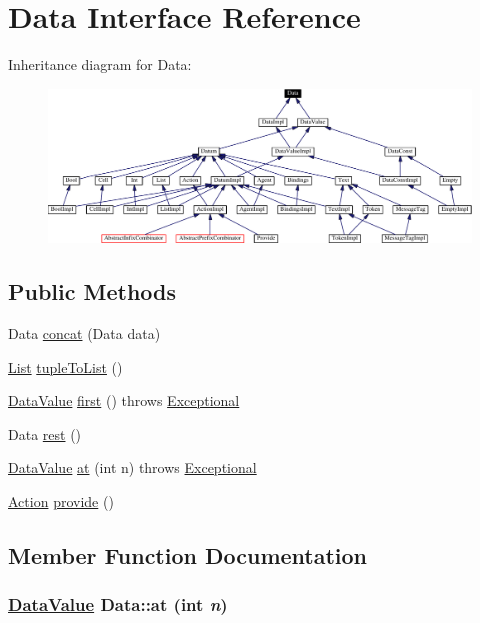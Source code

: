 \hypertarget{interfaceData}{
\section{Data  Interface Reference}
\label{interfaceData}
}
Inheritance diagram for Data:\begin{figure}[H]
\begin{center}
\leavevmode
\includegraphics[width=381pt]{interfaceData__inherit__graph}
\end{center}
\end{figure}
\subsection*{Public Methods}
\begin{CompactItemize}
\item 
Data \hyperlink{interfaceData_a0}{concat} (Data data)
\item 
\hyperlink{interfaceList}{List} \hyperlink{interfaceData_a1}{tuple\-To\-List} ()
\item 
\hyperlink{interfaceDataValue}{Data\-Value} \hyperlink{interfaceData_a2}{first} () throws \hyperlink{classExceptional}{Exceptional}
\item 
Data \hyperlink{interfaceData_a3}{rest} ()
\item 
\hyperlink{interfaceDataValue}{Data\-Value} \hyperlink{interfaceData_a4}{at} (int n) throws \hyperlink{classExceptional}{Exceptional}
\item 
\hyperlink{interfaceAction}{Action} \hyperlink{interfaceData_a5}{provide} ()
\end{CompactItemize}


\subsection{Member Function Documentation}
\hypertarget{interfaceData_a4}{
\subsubsection[at]{\setlength{\rightskip}{0pt plus 5cm}\hyperlink{interfaceDataValue}{Data\-Value} Data::at (int {\em n})}}
\label{interfaceData_a4}




